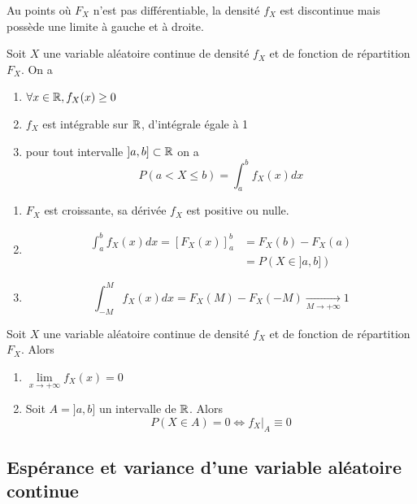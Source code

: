 \documentclass[a4paper,12pt]{article}
\begin{document}
\begin{remarque}
    Au points où $F_X$ n'est pas différentiable, la densité $f_X$ est discontinue mais possède une limite à gauche et à droite.
\end{remarque}

\begin{proposition}{}{}
    Soit $X$ une variable aléatoire continue de densité $f_X$ et de fonction de répartition $F_X$. On a
    \begin{enumerate}
        \item $\forall x \in \mathbb{R}, f_X(x) \geq 0$
        \item $f_X$ est intégrable sur $\mathbb{R}$, d'intégrale égale à 1
        \item pour tout intervalle $]a, b] \subset \mathbb{R}$ on a
        $$
        P(a < X \leq b) = \int_a^b f_X(x)dx
        $$
    \end{enumerate}
\end{proposition}

\begin{demonstration}
    \begin{enumerate}
        \item $F_X$ est croissante, sa dérivée $f_X$ est positive ou nulle.
        \item 
        \begin{align*}
            \int_a^b f_X(x)dx = [F_X(x)]_a^b &= F_X(b) - F_X(a) \\
            &= P(X \in ]a, b])
        \end{align*}
        \item
        $$
        \int_{-M}^M f_X(x)dx = F_X(M) - F_X(-M) \underset{M \to +\infty}{\to} 1
        $$
    \end{enumerate}
\end{demonstration}

\begin{corollaire}{}{}
    Soit $X$ une variable aléatoire continue de densité $f_X$ et de fonction de répartition $F_X$. Alors
    \begin{enumerate}
        \item $\lim\limits_{x \to +\infty} f_X(x) = 0$
        \item Soit $A = ]a, b]$ un intervalle de $\mathbb{R}$. Alors
        $$
        P(X \in A) = 0 \iff f_X|_A \equiv 0
        $$
    \end{enumerate}
\end{corollaire}

\subsection{Espérance et variance d'une variable aléatoire continue}
\end{document}
